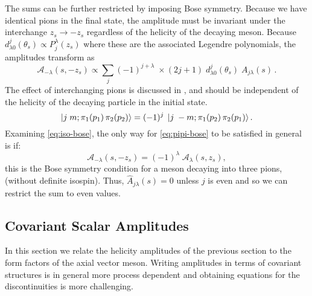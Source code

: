 \documentclass[10pt, aps,prd,amsmath,amssymb,superscriptaddress,onecolumn,
nofootinbib,showpacs,preprintnumbers]{revtex4-1}
\begin{document}
The sums can be further restricted by imposing Bose symmetry. Because we have identical pions in the final state, the amplitude must be invariant under the interchange \(z_s \to -z_s\) regardless of the helicity of the decaying meson.
Because \(d^j_{\lambda0}(\theta_s) \propto P^\lambda_j(z_s)\) where these are the associated Legendre polynomials, the amplitudes transform as
  \begin{equation}
    \label{eq:iso-bose}
   \mathcal{A}_{-\lambda}(s, -z_s) \propto \sum_{j} (-1)^{j+\lambda} \; \times (2j+1) \;  d^j_{\lambda0}(\theta_s) \; A_{j\lambda}(s) \,.
  \end{equation}
The effect of interchanging pions is discussed in \cite{JACOB1959404}, and should be independent of the helicity of the decaying particle in the initial state.
  \begin{equation}
    \label{eq:pipi-bose}
    \ket{j \; m ; \pi_1(p_1) \, \pi_2(p_2)} = (-1)^j \; \ket{j \; -m; \pi_1(p_2) \, \pi_2(p_1)}.
  \end{equation}
Examining \cref{eq:iso-bose}, the only way for \cref{eq:pipi-bose} to be satisfied in general is if:
  \begin{equation}
    \label{eq:helicity-bose}
    \mathcal{A}_{-\lambda}(s,-z_s) = (-1)^\lambda \; \mathcal{A}_{\lambda}(s, z_s),
  \end{equation}
this is the Bose symmetry condition for a meson decaying into three pions, (without definite isospin).
Thus, \(\hat{A}_{j\lambda}(s) = 0\) unless \(j\) is even and so we can restrict the sum to even values.
 \subsection{Covariant Scalar Amplitudes} \label{sec:covariant}
 In this section we relate the helicity amplitudes of the previous section to the form factors of the axial vector meson. Writing amplitudes in terms of covariant structures is in general more process dependent and obtaining equations for the discontinuities is more challenging.
\end{document}

